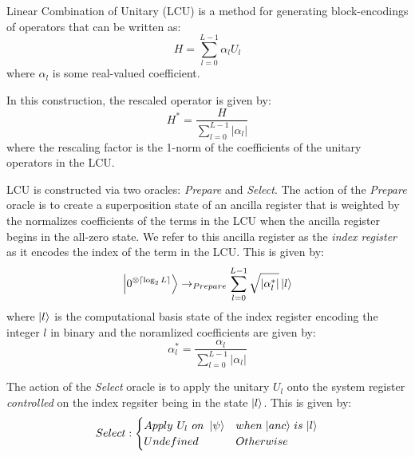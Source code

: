 Linear Combination of Unitary (LCU) is a method for generating block-encodings of operators that can be written as:
\begin{equation}
    H = \sum_{l=0}^{L-1} \alpha_l U_l
\end{equation}
where $\alpha_l$ is some real-valued coefficient.

In this construction, the rescaled operator is given by:
\begin{equation}
    H^* = \frac{H}{\sum_{l=0}^{L-1} | \alpha_l |}
\end{equation}
where the rescaling factor is the 1-norm of the coefficients of the unitary operators in the LCU.

LCU is constructed via two oracles: \textit{Prepare} and \textit{Select}.
The action of the \textit{Prepare} oracle is to create a superposition state of an ancilla register that is weighted by the normalizes coefficients of the terms in the LCU when the ancilla register begins in the all-zero state.
We refer to this ancilla register as the \textit{index register} as it encodes the index of the term in the LCU.
This is given by:
\begin{equation}
    \ket{0^{\otimes \lceil \log_2 L \rceil}} \rightarrow_{Prepare} \sum_{l=0}^{L-1} \sqrt{| \alpha_l^* |} \ket{l}
\end{equation}
where $\ket{l}$ is the computational basis state of the index register encoding the integer $l$ in binary and the noramlized coefficients are given by:
\begin{equation}
    \alpha_l^* = \frac{\alpha_l}{\sum_{l=0}^{L-1} | \alpha_l |}
\end{equation}

The action of the \textit{Select} oracle is to apply the unitary $U_l$ onto the system register \textit{controlled} on the index regsiter being in the state $\ket{l}$.
This is given by:
\begin{equation}
    Select: 
    \begin{cases} 
        Apply \hspace{0.125cm} U_l \hspace{0.125cm} on \hspace{0.125cm} \ket{\psi} & when \hspace{0.05cm} \ket{anc} \hspace{0.05cm} is \hspace{0.05cm} \ket{l} \\
        Undefined & Otherwise \\
    \end{cases}
\end{equation}

